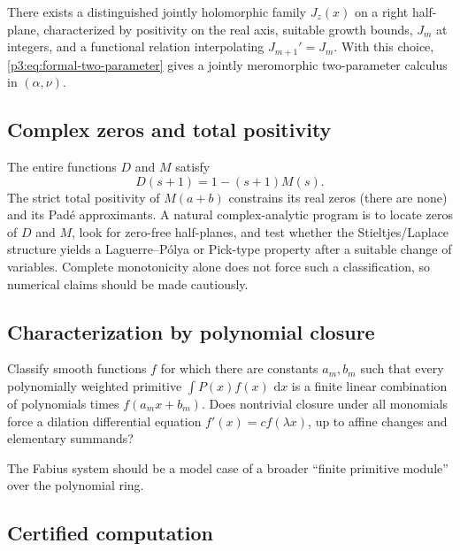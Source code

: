 \documentclass[11pt,oneside]{article}
\theoremstyle{definition}
\theoremstyle{remark}
\newcommand{\dd}{\,\mathrm d}
\newcommand{\1}{\mathbf 1}
\begin{document}
\begin{conjecture}
There exists a distinguished jointly holomorphic family $J_z(x)$ on a right half-plane,
characterized by positivity on the real axis, suitable growth bounds, $J_m$ at integers, and
a functional relation interpolating $J_{m+1}'=J_m$.  With this choice,
\eqref{p3:eq:formal-two-parameter} gives a jointly meromorphic two-parameter calculus in
$(\alpha,\nu)$.
\end{conjecture}

\subsection{Complex zeros and total positivity}

The entire functions $D$ and $M$ satisfy
\begin{equation}
 D(s+1)=1-(s+1)M(s).                                         \label{p3:eq:D-M}
\end{equation}
The strict total positivity of $M(a+b)$ constrains its real zeros (there are none) and its
Pad\'e approximants.  A natural complex-analytic program is to locate zeros of $D$ and $M$,
look for zero-free half-planes, and test whether the Stieltjes/Laplace structure yields a
Laguerre--P\'olya or Pick-type property after a suitable change of variables.  Complete
monotonicity alone does not force such a classification, so numerical claims should be made
cautiously.

\subsection{Characterization by polynomial closure}

\begin{problem}[Rigidity]
Classify smooth functions $f$ for which there are constants $a_m,b_m$ such that every
polynomially weighted primitive $\int P(x)f(x)\,\dd x$ is a finite linear combination of
polynomials times $f(a_mx+b_m)$.  Does nontrivial closure under all monomials force a
dilation differential equation $f'(x)=cf(\lambda x)$, up to affine changes and elementary
summands?
\end{problem}

The Fabius system should be a model case of a broader ``finite primitive module'' over the
polynomial ring.

\subsection{Certified computation}
\end{document}
